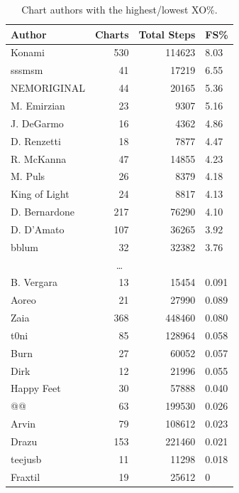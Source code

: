 \documentclass[10pt]{sigplanconf}
\begin{document}
\begin{table}[t]
	\begin{center}
		\small
	\begin{tabular}{l|r|r|l}
		\bf Author & \bf Charts & \bf Total Steps & \bf FS\% \\
		\hline
		Konami        & 530 & 114623 & 8.03 \\
		sssmsm        &  41 &  17219 & 6.55 \\
		NEMORIGINAL   &  44 &  20165 & 5.36 \\
		M. Emirzian   &  23 &   9307 & 5.16 \\
		J. DeGarmo    &  16 &   4362 & 4.86 \\
		D. Renzetti   &  18 &   7877 & 4.47 \\
		R. McKanna    &  47 &  14855 & 4.23 \\
		M. Puls       &  26 &   8379 & 4.18 \\
		King of Light &  24 &   8817 & 4.13 \\
		D. Bernardone & 217 &  76290 & 4.10 \\
		D. D'Amato    & 107 &  36265 & 3.92 \\
		bblum         &  32 &  32382 & 3.76 \\
		\multicolumn{4}{c}{\normalsize\dots} \\
		B. Vergara    &  13 &  15454 & 0.091 \\
		Aoreo         &  21 &  27990 & 0.089 \\
		Zaia          & 368 & 448460 & 0.080 \\
		t0ni          &  85 & 128964 & 0.058 \\
		Burn          &  27 &  60052 & 0.057 \\
		Dirk          &  12 &  21996 & 0.055 \\
		Happy Feet    &  30 &  57888 & 0.040 \\
		@@            &  63 & 199530 & 0.026 \\
		Arvin         &  79 & 108612 & 0.023 \\
		Drazu         & 153 & 221460 & 0.021 \\
		teejusb       &  11 &  11298 & 0.018 \\
		Fraxtil       &  19 &  25612 & 0 \\
	\end{tabular}
	\end{center}
	\caption{Chart authors with the highest/lowest XO\%.}
\end{table}
\end{document}
